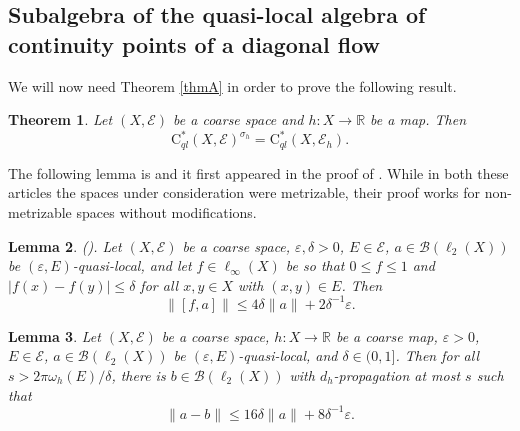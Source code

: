 \documentclass[11pt]{amsart}
\newcommand{\R}{\mathbb{R}}
\newcommand{\B}{\mathcal{B}}
\newcommand{\cB}{\mathcal{B}}
\newcommand{\cE}{\mathcal{E}}
\newcommand{\eps}{\varepsilon}
\newcommand{\cstql}{\mathrm{C}^*_{\textit{ql}}}
\numberwithin{equation}{section}
\newtheorem{theorem}{Theorem}[section]
\newtheorem{lemma}[theorem]{Lemma}
\theoremstyle{definition}
\theoremstyle{remark}
\begin{document}
\subsection{Subalgebra of the  quasi-local algebra of  continuity points of a diagonal flow} We will now need Theorem \ref{thmA} in order to prove the following result.



\begin{theorem}\label{Thm.qla.h.Points.Cont.Substructure}
    Let $(X,\cE)$ be a coarse space and $h\colon X\to \R$ be a map. Then
    \[\cstql(X,\cE)^{\sigma_h}=\cstql(X,\cE_h).\]
\end{theorem}

The following lemma is
 \cite[Lemma 6]{Ozawa2023} and it first appeared in the proof of \cite[Theorem 2.8]{SpakulaTikuisis2019}. While in both these articles the spaces under consideration were metrizable, their proof works for non-metrizable spaces without modifications.

\begin{lemma}\emph{(}\cite[Lemma 6]{Ozawa2023}\emph{).}
Let $(X,\cE)$ be a  coarse space, $\eps,\delta>0$, $E\in \cE$,   $a\in\B(\ell_2(X))$ be $(\eps,E)$-quasi-local, and let $f\in\ell_\infty(X)$ be so that   $0\le f\leq 1$ and $|f(x)-f(y)|\le\delta$ for all $x,y\in X$ with $(x,y)\in E$. Then
\begin{equation*}
\|[f,a]\|\le 4\delta\|a\|+2\delta^{-1}\varepsilon .
\end{equation*} \label{lem:commutator}
\end{lemma}


\begin{lemma}\label{lem:smoothing}
Let $(X,\cE)$ be a coarse space, $h\colon X\to\R$ be a coarse map, $\eps>0$, $E\in \cE$,   $a\in\B(\ell_2(X))$  be  $(\eps,E)$-quasi-local, and $\delta\in (0,1]$.  Then for all $s>2\pi\omega_h(E)/\delta$, there is  $b\in \cB(\ell_2(X))$ with $d_h$-propagation at most $s$  such that
\begin{equation}\label{Eq.3.Aug.26.Depois.lhovav}
\|a-b\|\le 16\delta\|a\|+8\delta^{-1}\varepsilon .
\end{equation}
\end{lemma}
\end{document}
